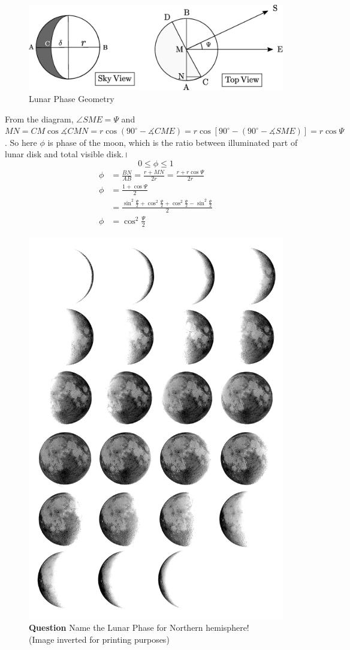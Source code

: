 \documentclass[a4paper,12pt]{extarticle}
\begin{document}
\begin{figure}[H]
	\centering
	\includegraphics[width=0.7\linewidth]{mphase1.eps}
	\caption{Lunar Phase Geometry}
\end{figure}
From the diagram, $\angle SME= \Psi$ and $MN= CM \cos \measuredangle CMN=r\cos (90^\circ- \measuredangle CME)=r\cos [90^\circ-(90^\circ-\measuredangle SME)]= r \cos \Psi$. So here $\phi$ is phase of the moon, which is the ratio between illuminated part of lunar disk and total visible disk.।
\[\boxed{0 \leq \phi \leq 1}\] 	
\begin{align}
	\phi &=\frac{BN}{AB}=\frac{r+MN}{2r}=\frac{r+r\cos\Psi}{2r} \nonumber \\
	\phi&= \frac{1+\cos\Psi}{2}\\
	&=\frac{\sin^2\frac{\Psi}{2}+\cos^2\frac{\Psi}{2}+ \cos^2\frac{\Psi}{2}-\sin^2\frac{\Psi}{2}}{2}\nonumber\\
	\phi&=\cos^2 \frac{\Psi}{2} \label{lunareqq}
\end{align}

\begin{figure}[H]
	\centering
	\includegraphics[width=0.7\linewidth]{moon_phase.png}
	\caption*{\textsf{\textbf{Question}} Name the Lunar Phase for Northern hemisphere!\\ 
	(Image inverted for printing purposes)}
\end{figure}
\end{document}
